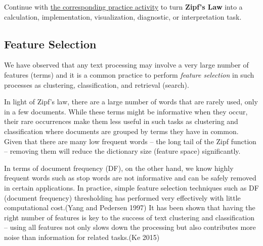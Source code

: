 \documentclass[
  letterpaper,
]{scrbook}
\begin{document}
\begin{tcolorbox}[enhanced jigsaw, arc=.35mm, bottomrule=.15mm, bottomtitle=1mm, breakable, colback=white, colbacktitle=quarto-callout-tip-color!10!white, colframe=quarto-callout-tip-color-frame, coltitle=black, left=2mm, leftrule=.75mm, opacityback=0, opacitybacktitle=0.6, rightrule=.15mm, title=\textcolor{quarto-callout-tip-color}{\faLightbulb}\hspace{0.5em}{Put it into practice}, titlerule=0mm, toprule=.15mm, toptitle=1mm]

Continue with \hyperref[sec-pr-11-zipf-s-law]{the corresponding practice
activity} to turn \textbf{Zipf's Law} into a calculation,
implementation, visualization, diagnostic, or interpretation task.

\end{tcolorbox}

\subsection{Feature Selection}\label{feature-selection}

We have observed that any text processing may involve a very large
number of features (terms) and it is a common practice to perform
\emph{feature selection} in such processes as clustering,
classification, and retrieval (search).

In light of Zipf's law, there are a large number of words that are
rarely used, only in a few documents. While these terms might be
informative when they occur, their rare occurrences make them less
useful in such tasks as clustering and classification where documents
are grouped by terms they have in common. Given that there are many low
frequent words -- the long tail of the Zipf function -- removing them
will reduce the dictionary size (feature space) significantly.

In terms of document frequency (DF), on the other hand, we know highly
frequent words such as stop words are not informative and can be safely
removed in certain applications. In practice, simple feature selection
techniques such as DF (document frequency) thresholding has performed
very effectively with little computational cost.(Yang and Pedersen 1997)
It has been shown that having the right number of features is key to the
success of text clustering and classification -- using all features not
only slows down the processing but also contributes more noise than
information for related tasks.(Ke 2015)
\end{document}
